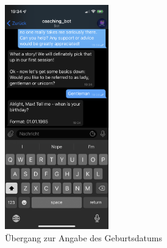 


	\begin{figure}
		\centering
		\includegraphics[width=0.4\textwidth]{images/Screenshots/birthdate.PNG}
		\caption{Übergang zur Angabe des Geburtsdatums}
		\label{fig: scs..birthdate}
	\end{figure}


